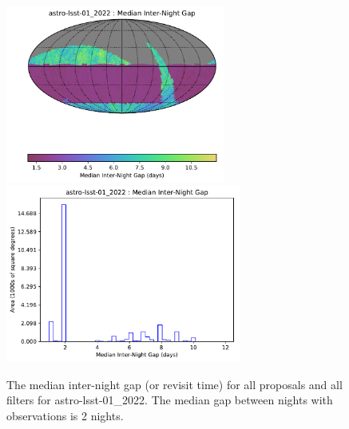 \documentclass[DM,authoryear,toc]{lsstdoc}
\begin{document}
\begin{figure}[htb]
\centering
\vskip -0.0in
\includegraphics[height=2.3in]{figures/astro-lsst-01_2022_Median_Inter-Night_Gap_HEAL_SkyMap.pdf}
\includegraphics[height=2.3in]{figures/astro-lsst-01_2022_Median_Inter-Night_Gap_HEAL_Histogram.pdf}
\vskip -0.1in
\caption{The median inter-night gap (or revisit time)  for all proposals and all filters for astro-lsst-01\_2022.
The median gap between nights with observations is 2 nights.
\label{fig:baseline_GapAll}}
\end{figure}
\end{document}

